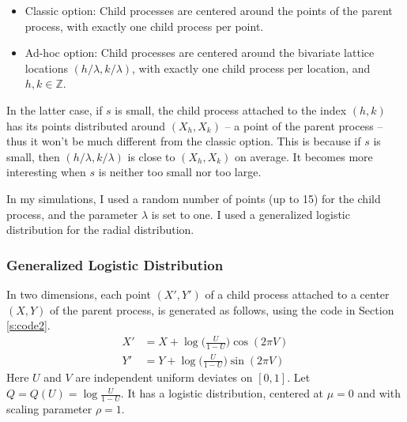 \documentclass[10pt]{article}
\begin{document}
\begin{itemize}
\item Classic option: Child processes are centered around the points of the parent process, with exactly one child process per point.
\item Ad-hoc option: Child processes are centered around the bivariate lattice locations $(h/\lambda,k/\lambda)$, with exactly one child process per location, and $h,k\in \mathbb{Z}$.
\end{itemize}
In the latter case, if $s$ is small, the child process attached to the index $(h,k)$ has its points distributed around $(X_h, X_k)$ -- a point of the parent process -- thus it won't be much different from the classic option. This is because if $s$ is small, then $(h/\lambda,k/\lambda)$ is close to $(X_h, X_k)$ on average. It becomes more interesting when $s$ is neither too small nor too large.

In my simulations, I used a random number of points (up to 15) for the child process, and the parameter $\lambda$ is set to one. I used a generalized logistic distribution for the radial distribution.

\subsubsection{Generalized Logistic Distribution}\label{sec:gld}

In two dimensions, each point $(X', Y')$ of a child process attached to a center $(X, Y)$ of the parent process, is generated as follows, using the code in Section \ref{s:code2}.
\begin{align}
X' & = X + \log\Big(\frac{U}{1-U}\Big) \cos(2\pi V)\label{hlog1}\\
Y' & = Y + \log\Big(\frac{U}{1-U}\Big) \sin(2\pi V)\label{hlog2}
\end{align}
Here $U$ and $V$ are independent uniform deviates on $[0, 1]$. Let $Q = Q(U)=\log\frac{U}{1-U}$. It has a logistic distribution, centered at $\mu=0$ and with scaling parameter $\rho=1$.
\end{document}
